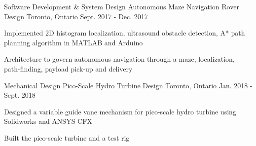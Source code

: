\begin{cventries}
  \cventry
    {Software Development \& System Design}
    {Autonomous Maze Navigation Rover Design}
    {Toronto, Ontario}
    {Sept. 2017 - Dec. 2017}
    {
      \begin{cvitems}
        \item {Implemented 2D histogram localization, ultrasound obstacle detection, A* path planning algorithm in MATLAB and Arduino}
        \item {Architecture to govern autonomous navigation through a maze, localization, path-finding, payload pick-up and delivery}
      \end{cvitems}
    }

  \cventry
    {Mechanical Design}
    {Pico-Scale Hydro Turbine Design}
    {Toronto, Ontario}
    {Jan. 2018 - Sept. 2018}
    {
      \begin{cvitems}
        \item {Designed a variable guide vane mechanism for pico-scale hydro turbine using Solidworks and ANSYS CFX}
        \item {Built the pico-scale turbine and a test rig}
      \end{cvitems}
    }



\end{cventries}